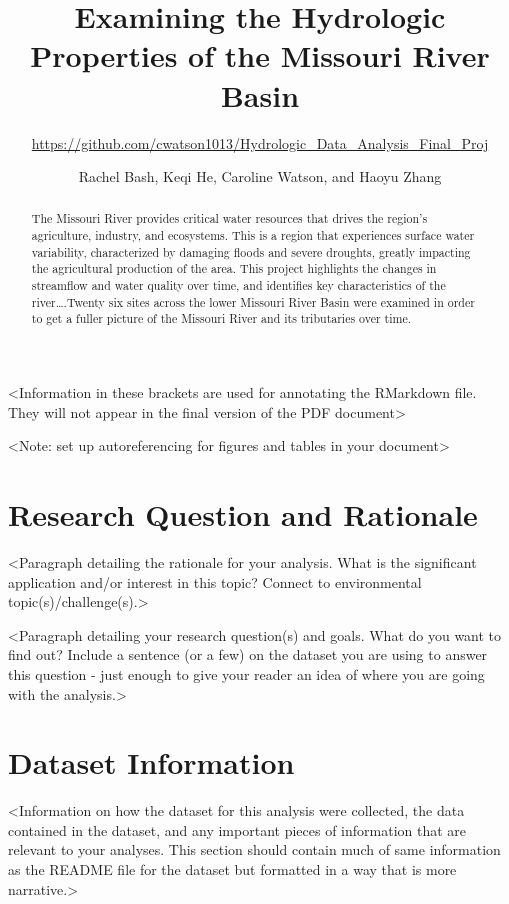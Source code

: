 \documentclass[12pt,]{article}
\title{Examining the Hydrologic Properties of the Missouri River Basin}
\subtitle{\url{https://github.com/cwatson1013/Hydrologic_Data_Analysis_Final_Proj}}
\author{Rachel Bash, Keqi He, Caroline Watson, and Haoyu Zhang}
\date{}
\begin{document}
\maketitle
\begin{abstract}
The Missouri River provides critical water resources that drives the
region's agriculture, industry, and ecosystems. This is a region that
experiences surface water variability, characterized by damaging floods
and severe droughts, greatly impacting the agricultural production of
the area. This project highlights the changes in streamflow and water
quality over time, and identifies key characteristics of the
river\ldots{}.Twenty six sites across the lower Missouri River Basin
were examined in order to get a fuller picture of the Missouri River and
its tributaries over time.
\end{abstract}

\textless{}Information in these brackets are used for annotating the
RMarkdown file. They will not appear in the final version of the PDF
document\textgreater{}

\newpage
\tableofcontents 
\newpage
\listoftables 
\newpage
\listoffigures 
\newpage

\textless{}Note: set up autoreferencing for figures and tables in your
document\textgreater{}

\hypertarget{research-question-and-rationale}{%
\section{Research Question and
Rationale}\label{research-question-and-rationale}}

\textless{}Paragraph detailing the rationale for your analysis. What is
the significant application and/or interest in this topic? Connect to
environmental topic(s)/challenge(s).\textgreater{}

\textless{}Paragraph detailing your research question(s) and goals. What
do you want to find out? Include a sentence (or a few) on the dataset
you are using to answer this question - just enough to give your reader
an idea of where you are going with the analysis.\textgreater{}

\newpage

\hypertarget{dataset-information}{%
\section{Dataset Information}\label{dataset-information}}

\textless{}Information on how the dataset for this analysis were
collected, the data contained in the dataset, and any important pieces
of information that are relevant to your analyses. This section should
contain much of same information as the README file for the dataset but
formatted in a way that is more narrative.\textgreater{}
\end{document}
